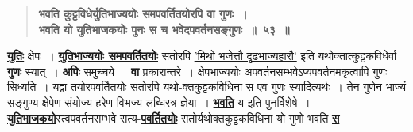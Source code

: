 \documentclass[11pt, openany]{book}
\begin{document}
\begin{sloppypar}
 \label{5.53}
\begin{quote}
{\large \textbf{{\color{purple}भवति कुट्टविधेर्युतिभाज्ययोः समपवर्तितयोरपि वा गुणः~।\\
भवति यो युतिभाजकयोः पुनः स च भवेदपवर्तनसङ्गुणः~॥~५३~॥}}}
\end{quote}

\hyperref[5.53]{\textbf{युतिः}} क्षेपः~। \hyperref[5.53]{\textbf{युतिभाज्ययोः समपवर्तितयोः}} सतोरपि \hyperref[5.51]{'मिथो भजेत्तौ दृढभाज्यहारौ'} इति यथोक्तात्कुट्टकविधेर्वा \hyperref[5.53]{\textbf{गुणः}} स्यात्~। \hyperref[5.53]{\textbf{अपिः}} समुच्चये~। \hyperref[5.53]{\textbf{वा}} प्रकारान्तरे~। क्षेपभाज्ययोः अपवर्तनसम्भवेऽप्यपवर्तनमकृत्वापि गुणः सिध्यति~। यद्वा तयोरपवर्तितयोः सतोरपि यथो-क्तकुट्टकविधिना स एव गुणः स्यादित्यर्थः~। तेन गुणेन भाज्यं सङ्गुण्य क्षेपेण संयोज्य हरेण विभज्य लब्धिरत्र ज्ञेया~। \hyperref[5.53]{\textbf{भवति}} य इति पुनर्विशेषे~। \hyperref[5.53]{\textbf{युतिभाजकयो}}स्त्वपवर्तनसम्भवे सत्य-\hyperref[5.53]{\textbf{पवर्तितयोः}} सतोर्यथोक्तकुट्टकविधिना यो गुणो भवति \hyperref[5.53]{\textbf{स}}
\end{sloppypar}

\newpage
\end{document}
